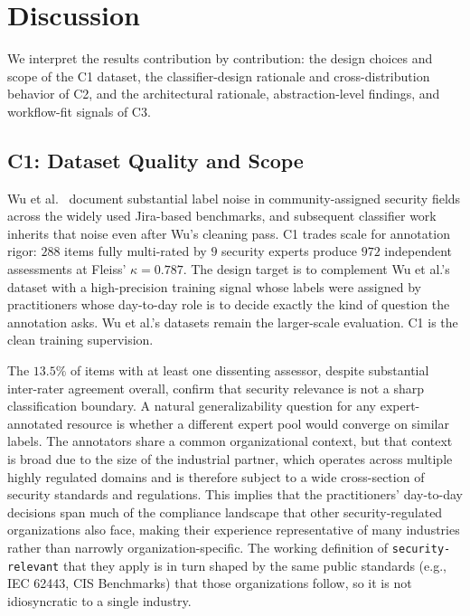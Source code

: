 \section{Discussion}
We interpret the results contribution by contribution: the design choices and scope of the C1 dataset, the classifier-design rationale and cross-distribution behavior of C2, and the architectural rationale, abstraction-level findings, and workflow-fit signals of C3.


\subsection*{C1: Dataset Quality and Scope}\label{sec:discussion-c1}

Wu et al.~\cite{wu2022data-quality} document substantial label noise in community-assigned security fields across the widely used Jira-based benchmarks, and subsequent classifier work~\cite{alqahtani2024fasttext, franca2025gpts, soltaniani2026evaluating-llms} inherits that noise even after Wu's cleaning pass.
C1 trades scale for annotation rigor: $288$ items fully multi-rated by $9$ security experts produce $972$ independent assessments at Fleiss' $\kappa = 0.787$.
The design target is to complement Wu et al.'s dataset with a high-precision training signal whose labels were assigned by practitioners whose day-to-day role is to decide exactly the kind of question the annotation asks.
Wu et al.'s datasets remain the larger-scale evaluation. C1 is the clean training supervision.

The $13.5\%$ of items with at least one dissenting assessor, despite substantial inter-rater agreement overall, confirm that security relevance is not a sharp classification boundary.
A natural generalizability question for any expert-annotated resource is whether a different expert pool would converge on similar labels.
The annotators share a common organizational context, but that context is broad due to the size of the industrial partner, which operates across multiple highly regulated domains and is therefore subject to a wide cross-section of security standards and regulations.
This implies that the practitioners' day-to-day decisions span much of the compliance landscape that other security-regulated organizations also face, making their experience representative of many industries rather than narrowly organization-specific.
The working definition of \texttt{security-relevant} that they apply is in turn shaped by the same public standards (e.g., IEC 62443, CIS Benchmarks) that those organizations follow, so it is not idiosyncratic to a single industry.

